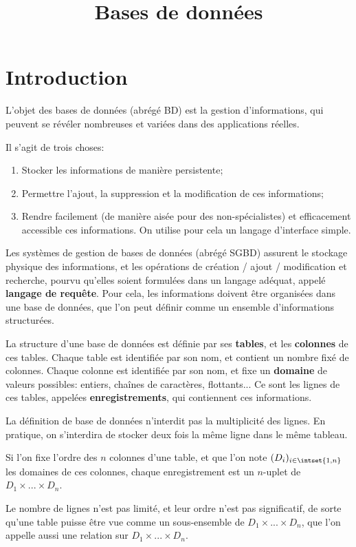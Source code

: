 \documentclass[a4paper]{scrartcl}
\title{Bases de données}
\author{}
\date{}
\begin{document}
	\maketitle
	\section{Introduction}
		L'objet des bases de données (abrégé BD) est la gestion d'informations,
		qui peuvent se révéler nombreuses et variées dans des applications réelles.

		Il s'agit de trois choses:
		\begin{enumerate}
			\item Stocker les informations de manière persistente;
			\item Permettre l'ajout, la suppression et la modification de ces informations;
			\item Rendre facilement (de manière aisée pour des non-spécialistes) et efficacement accessible ces informations. 
			On utilise pour cela un langage d'interface simple.
		\end{enumerate}

		Les systèmes de gestion de bases de données (abrégé SGBD) assurent le stockage physique des informations,
		et les opérations de création / ajout / modification et recherche, 
		pourvu qu'elles soient formulées dans un langage adéquat, appelé \textbf{langage de requête}.
		Pour cela, les informations doivent être organisées dans une base de données, 
		que l'on peut définir comme un ensemble d'informations structurées.

		La structure d'une base de données est définie par ses \textbf{tables}, et les \textbf{colonnes} de ces tables.
		Chaque table est identifiée par son nom, et contient un nombre fixé de colonnes.
		Chaque colonne est identifiée par son nom, et fixe un \textbf{domaine} de valeurs possibles:
		entiers, chaînes de caractères, flottants...
		Ce sont les lignes de ces tables, appelées \textbf{enregistrements}, qui contiennent ces informations.

		\rem La définition de base de données n'interdit pas la multiplicité des lignes. 
		En pratique, on s'interdira de stocker deux fois la même ligne dans le même tableau.

		Si l'on fixe l'ordre des $n$ colonnes d'une table, et que l'on note 
		$(D_i)_{i\in\intset{1,n}}$ les domaines de ces colonnes, chaque enregistrement est un $n$-uplet
		de $D_1\times...\times D_n$.

		Le nombre de lignes n'est pas limité, et leur ordre n'est pas significatif, de sorte qu'une table puisse être vue 
		comme un sous-ensemble de $D_1\times...\times D_n$, que l'on appelle aussi une relation sur $D_1\times...\times D_n$.
		
\end{document}
